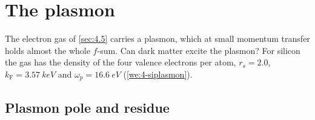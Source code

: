 \section{The plasmon}\label{sec:10.3}

The electron gas of \cref{sec:4.5} carries a plasmon, which at small momentum transfer holds almost the whole $f$-sum. Can dark matter excite the plasmon? For silicon the gas has the density of the four valence electrons per atom, $r_s = 2.0$, $k_{\mathrm{F}} = \SI{3.57}{keV}$ and $\omega_p = \SI{16.6}{eV}$ (\cref{we:4-siplasmon}).

\subsection{Plasmon pole and residue}\label{sec:10.3-pole}


